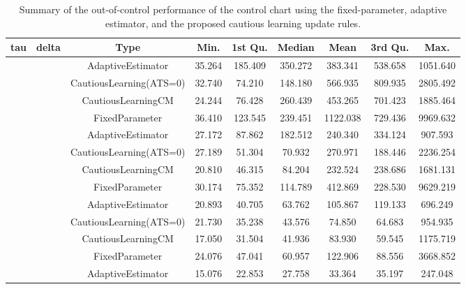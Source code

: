 \begin{table}[!h]

\caption{Summary of the out-of-control performance of the control chart using the fixed-parameter, adaptive estimator, and the proposed cautious learning update rules.}
\centering
\begin{tabular}[t]{ccccccccc}
\toprule
tau & delta & Type & Min. & 1st Qu. & Median & Mean & 3rd Qu. & Max.\\
\midrule
 &  & AdaptiveEstimator & 35.264 & 185.409 & 350.272 & 383.341 & 538.658 & 1051.640\\

 &  & CautiousLearning(ATS=0) & 32.740 & 74.210 & 148.180 & 566.935 & 809.935 & 2805.492\\

 &  & CautiousLearningCM & 24.244 & 76.428 & 260.439 & 453.265 & 701.423 & 1885.464\\

 & \multirow[t]{-4}{*}{\centering\arraybackslash 0.25} & FixedParameter & 36.410 & 123.545 & 239.451 & 1122.038 & 729.436 & 9969.632\\
\cmidrule{2-9}
 &  & AdaptiveEstimator & 27.172 & 87.862 & 182.512 & 240.340 & 334.124 & 907.593\\

 &  & CautiousLearning(ATS=0) & 27.189 & 51.304 & 70.932 & 270.971 & 188.446 & 2236.254\\

 &  & CautiousLearningCM & 20.810 & 46.315 & 84.204 & 232.524 & 238.686 & 1681.131\\

 & \multirow[t]{-4}{*}{\centering\arraybackslash 0.35} & FixedParameter & 30.174 & 75.352 & 114.789 & 412.869 & 228.530 & 9629.219\\
\cmidrule{2-9}
 &  & AdaptiveEstimator & 20.893 & 40.705 & 63.762 & 105.867 & 119.133 & 696.249\\

 &  & CautiousLearning(ATS=0) & 21.730 & 35.238 & 43.576 & 74.850 & 64.683 & 954.935\\

 &  & CautiousLearningCM & 17.050 & 31.504 & 41.936 & 83.930 & 59.545 & 1175.719\\

 & \multirow[t]{-4}{*}{\centering\arraybackslash 0.50} & FixedParameter & 24.076 & 47.041 & 60.957 & 122.906 & 88.556 & 3668.852\\
\cmidrule{2-9}
 &  & AdaptiveEstimator & 15.076 & 22.853 & 27.758 & 33.364 & 35.197 & 247.048\\


\end{tabular}
\end{table}

